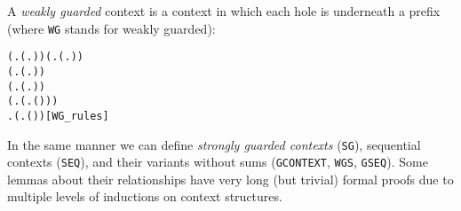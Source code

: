 A \emph{weakly guarded} context is a context in which each hole is
underneath a  prefix (where \texttt{WG} stands for weakly guarded):
\begin{alltt}
\HOLTokenTurnstile{} (\HOLSymConst{\HOLTokenForall{}}.  (\HOLTokenLambda{}. )) \HOLSymConst{\HOLTokenConj{}} (\HOLSymConst{\HOLTokenForall{}} .   \HOLSymConst{\HOLTokenImp{}}  (\HOLTokenLambda{}.  )) \HOLSymConst{\HOLTokenConj{}}
   (\HOLSymConst{\HOLTokenForall{}} .   \HOLSymConst{\HOLTokenConj{}}   \HOLSymConst{\HOLTokenImp{}}  (\HOLTokenLambda{}.   \HOLSymConst{+}  )) \HOLSymConst{\HOLTokenConj{}}
   (\HOLSymConst{\HOLTokenForall{}} .   \HOLSymConst{\HOLTokenConj{}}   \HOLSymConst{\HOLTokenImp{}}  (\HOLTokenLambda{}.   \HOLSymConst{\ensuremath{\parallel}}  )) \HOLSymConst{\HOLTokenConj{}}
   (\HOLSymConst{\HOLTokenForall{}} .   \HOLSymConst{\HOLTokenImp{}}  (\HOLTokenLambda{}. \HOLSymConst{\ensuremath{\nu}}  ( ))) \HOLSymConst{\HOLTokenConj{}}
   \HOLSymConst{\HOLTokenForall{}} .   \HOLSymConst{\HOLTokenImp{}}  (\HOLTokenLambda{}.  ( ) )\hfill{[WG_rules]}
\end{alltt}

In the same manner we can  define \emph{strongly guarded contexts}
(\texttt{SG}), sequential contexts (\texttt{SEQ}), and their
variants without  sums (\texttt{GCONTEXT}, \texttt{WGS},
\texttt{GSEQ}). Some lemmas about their relationships have very long
(but trivial) formal proofs due to multiple levels of
inductions on context structures.%

